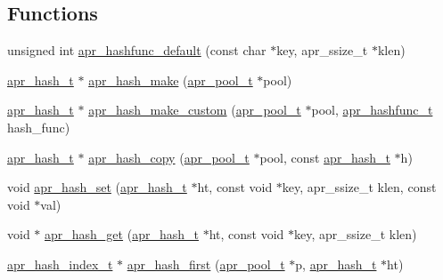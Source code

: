 \subsection*{Functions}
\begin{DoxyCompactItemize}
\item 
unsigned int \hyperlink{group__apr__hash_ga8baa6e9d9d6c2c496d2a0ff1a5c53abe}{apr\+\_\+hashfunc\+\_\+default} (const char $\ast$key, apr\+\_\+ssize\+\_\+t $\ast$klen)
\item 
\hyperlink{group__apr__hash_ga72ec09b8bde6d874c36bd49df915fff6}{apr\+\_\+hash\+\_\+t} $\ast$ \hyperlink{group__apr__hash_ga5f4b424d6761de4d32aa16ff6803bac9}{apr\+\_\+hash\+\_\+make} (\hyperlink{group__apr__pools_gaf137f28edcf9a086cd6bc36c20d7cdfb}{apr\+\_\+pool\+\_\+t} $\ast$pool)
\item 
\hyperlink{group__apr__hash_ga72ec09b8bde6d874c36bd49df915fff6}{apr\+\_\+hash\+\_\+t} $\ast$ \hyperlink{group__apr__hash_ga27f40acb206f1821a783ddcb71bc8971}{apr\+\_\+hash\+\_\+make\+\_\+custom} (\hyperlink{group__apr__pools_gaf137f28edcf9a086cd6bc36c20d7cdfb}{apr\+\_\+pool\+\_\+t} $\ast$pool, \hyperlink{group__apr__hash_ga0bf5622266af13a2489c907a101cb156}{apr\+\_\+hashfunc\+\_\+t} hash\+\_\+func)
\item 
\hyperlink{group__apr__hash_ga72ec09b8bde6d874c36bd49df915fff6}{apr\+\_\+hash\+\_\+t} $\ast$ \hyperlink{group__apr__hash_gafa0b1b9fb91b2249ee3bcb645d93e148}{apr\+\_\+hash\+\_\+copy} (\hyperlink{group__apr__pools_gaf137f28edcf9a086cd6bc36c20d7cdfb}{apr\+\_\+pool\+\_\+t} $\ast$pool, const \hyperlink{group__apr__hash_ga72ec09b8bde6d874c36bd49df915fff6}{apr\+\_\+hash\+\_\+t} $\ast$h)
\item 
void \hyperlink{group__apr__hash_ga456beb139bc548728b49c09c2f89b93c}{apr\+\_\+hash\+\_\+set} (\hyperlink{group__apr__hash_ga72ec09b8bde6d874c36bd49df915fff6}{apr\+\_\+hash\+\_\+t} $\ast$ht, const void $\ast$key, apr\+\_\+ssize\+\_\+t klen, const void $\ast$val)
\item 
void $\ast$ \hyperlink{group__apr__hash_ga05e526dad8afaebe14caea90d906d6ec}{apr\+\_\+hash\+\_\+get} (\hyperlink{group__apr__hash_ga72ec09b8bde6d874c36bd49df915fff6}{apr\+\_\+hash\+\_\+t} $\ast$ht, const void $\ast$key, apr\+\_\+ssize\+\_\+t klen)
\item 
\hyperlink{group__apr__hash_ga3b3d353989f6cea4535630634be147f7}{apr\+\_\+hash\+\_\+index\+\_\+t} $\ast$ \hyperlink{group__apr__hash_ga640005a4ba64a5db039b0b43a8ad4898}{apr\+\_\+hash\+\_\+first} (\hyperlink{group__apr__pools_gaf137f28edcf9a086cd6bc36c20d7cdfb}{apr\+\_\+pool\+\_\+t} $\ast$p, \hyperlink{group__apr__hash_ga72ec09b8bde6d874c36bd49df915fff6}{apr\+\_\+hash\+\_\+t} $\ast$ht)

\end{DoxyCompactItemize}
